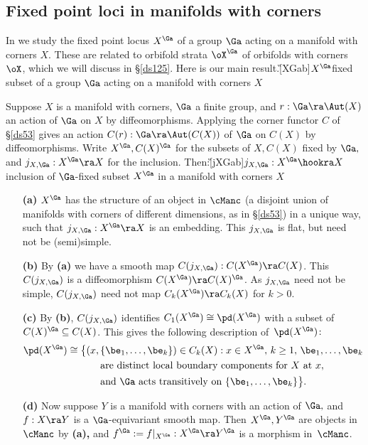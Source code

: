 \documentclass{article}
\begin{document}
\subsection{Fixed point loci in manifolds with corners}
\label{ds56}

In \cite[\S 5.5]{Joyc6} we study the fixed point locus $X^\Ga$ of a
group $\Ga$ acting on a manifold with corners $X$. These are related
to orbifold strata $\oX^\Ga$ of orbifolds with corners $\oX$, which
we will discuss in \S\ref{ds125}. Here is our main
result.\G[XGab]{$X^\Ga$}{fixed subset of a group $\Ga$ acting on a
manifold with corners $X$}

\begin{prop} Suppose $X$ is a manifold with corners, $\Ga$ a
finite group, and\/ $r:\Ga\ra\Aut(X)$ an action of\/ $\Ga$ on $X$ by
diffeomorphisms. Applying the corner functor $C$ of\/
{\rm\S\ref{ds53}} gives an action $C(r):\Ga\ra\Aut(C(X))$ of\/ $\Ga$
on $C(X)$ by diffeomorphisms. Write $X^\Ga,C(X)^\Ga$ for the subsets
of\/ $X,C(X)$ fixed by $\Ga,$ and\/ $j_{X,\Ga}:X^\Ga\ra X$ for the
inclusion. Then:\G[jXGab]{$j_{X,\Ga}:X^\Ga\hookra X$}{inclusion of
$\Ga$-fixed subset $X^\Ga$ in a manifold with corners $X$}
\begin{itemize}
\setlength{\itemsep}{0pt}
\setlength{\parsep}{0pt}
\item[{\bf(a)}] $X^\Ga$ has the structure of an object in
$\cManc$ {\rm(}a disjoint union of manifolds with corners of
different dimensions, as in {\rm\S\ref{ds53})} in a unique way,
such that\/ $j_{X,\Ga}:X^\Ga\ra X$ is an embedding. This\/
$j_{X,\Ga}$ is flat, but need not be (semi)simple.
\item[{\bf(b)}] By {\bf(a)} we have a smooth map
$C(j_{X,\Ga}):C(X^\Ga)\ra C(X)$. This $C(j_{X,\Ga})$ is a
diffeomorphism $C(X^\Ga)\ra C(X)^\Ga$. As\/ $j_{X,\Ga}$ need not
be simple, $C(j_{X,\Ga})$ need not map $C_k(X^\Ga)\ra C_k(X)$
for $k>0$.
\item[{\bf(c)}] By {\bf(b)}{\rm,} $C(j_{X,\Ga})$ identifies
$C_1(X^\Ga)\cong\pd(X^\Ga)$ with a subset of\/
$C(X)^\Ga\subseteq C(X)$. This gives the following description
of\/~$\pd(X^\Ga)\!:$
\begin{align*}
\pd(X^\Ga)\cong\bigl\{(x,\,&\{\be_1,\ldots,\be_k\})\in
C_k(X):\text{$x\in X^\Ga,$ $k\ge 1,$ $\be_1,\ldots,\be_k$}\\
&\text{are distinct local boundary components for $X$ at\/ $x,$}\\
&\text{and\/ $\Ga$ acts transitively on
$\{\be_1,\ldots,\be_k\}$}\bigr\}.
\end{align*}
\item[{\bf(d)}] Now suppose $Y$ is a manifold with corners with
an action of\/ $\Ga,$ and\/ $f:X\ra Y$ is a $\Ga$-equivariant
smooth map. Then $X^\Ga,Y^\Ga$ are objects in $\cManc$ by
{\bf(a)\rm,} and\/ $f^\Ga:=f\vert_{X^\Ga}:X^\Ga\ra Y^\Ga$ is a
morphism in\/~$\cManc$.
\end{itemize}
\label{ds5prop5}
\end{prop}
\end{document}
